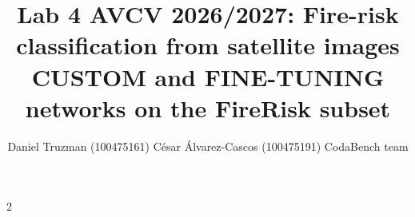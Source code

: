 \documentclass[10pt,a4paper]{article}
\title{\vspace{-1.2cm}\large\textbf{Lab 4 AVCV 2026/2027: Fire-risk classification from satellite images}\\[2pt]
       \normalsize CUSTOM and FINE-TUNING networks on the FireRisk subset\vspace{-0.3cm}}
\author{\small Daniel Truzman (100475161) \quad César Álvarez-Cascos (100475191)
        \quad\textbullet\quad CodaBench team \code{100475161\_100475191}\vspace{-0.4cm}}
\date{}
\begin{document}
\maketitle
\thispagestyle{plain}








\clearpage


{\scriptsize
\begin{multicols}{2}

\setlength{\bibsep}{0pt}
\renewcommand{\refname}{\normalsize\bfseries REFERENCES}

\end{multicols}}
\end{document}
